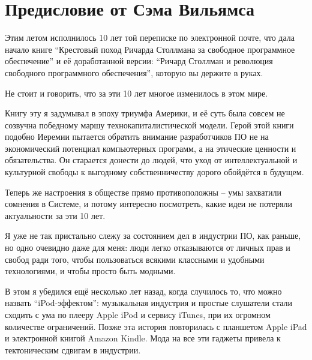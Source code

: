 
\chapter{Предисловие от Сэма Вильямса}

Этим летом исполнилось 10 лет той переписке по электронной почте,
что дала начало книге \enquote{Крестовый
поход Ричарда Столлмана за свободное программное обеспечение} и её
доработанной версии: \enquote{Ричард Столлман и революция свободного
программного обеспечения}, которую вы держите в руках.

Не стоит и говорить, что за эти 10 лет многое изменилось в этом мире.

Книгу эту я задумывал в эпоху триумфа Америки, и её суть была совсем
не созвучна победному маршу технокапиталистической модели.
Герой этой книги подобно Иеремии пытается обратить внимание
разработчиков ПО не на экономический потенциал компьютерных
программ, а на этические ценности и обязательства. Он старается донести
до людей, что уход от интеллектуальной и культурной свободы к
выгодному собственничеству дорого обойдётся в будущем.

Теперь же настроения в обществе прямо противоположны -- умы
захватили сомнения в Системе, и потому интересно посмотреть,
какие идеи не потеряли актуальности за эти 10 лет.

Я уже не так пристально слежу за состоянием дел в индустрии ПО,
как раньше, но одно очевидно даже для меня: люди легко отказываются
от личных прав и свобод ради того, чтобы пользоваться всякими
классными и удобными технологиями, и чтобы просто быть модными.

В этом я убедился ещё несколько лет назад, когда случилось то, что
можно назвать \enquote{iPod-эффектом}: музыкальная индустрия и простые
слушатели стали сходить с ума по плееру Apple iPod и сервису iTunes,
при их огромном количестве ограничений. Позже эта история повторилась
с планшетом Apple iPad и электронной книгой Amazon Kindle. Мода на
все эти гаджеты привела к тектоническим сдвигам в индустрии.

